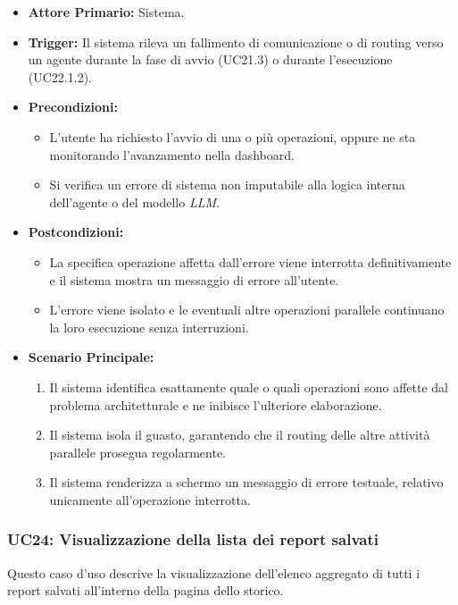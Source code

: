 \documentclass[12pt, a4paper]{article}
\begin{document}
\begin{itemize}
    \item \textbf{Attore Primario:} Sistema.
    \item \textbf{Trigger:} Il sistema rileva un fallimento di comunicazione o di routing verso un agente durante la fase di avvio (UC21.3) o durante l'esecuzione (UC22.1.2).
    \item \textbf{Precondizioni:}
    \begin{itemize}
        \item L'utente ha richiesto l'avvio di una o più operazioni, oppure ne sta monitorando l'avanzamento nella dashboard.
        \item Si verifica un errore di sistema non imputabile alla logica interna dell'agente o del modello \textit{LLM}.
    \end{itemize}
    \item \textbf{Postcondizioni:}
    \begin{itemize}
        \item La specifica operazione affetta dall'errore viene interrotta definitivamente e il sistema mostra un messaggio di errore all'utente.
        \item L'errore viene isolato e le eventuali altre operazioni parallele continuano la loro esecuzione senza interruzioni.
    \end{itemize}
    \item \textbf{Scenario Principale:}
    \begin{enumerate}
        \item Il sistema identifica esattamente quale o quali operazioni sono affette dal problema architetturale e ne inibisce l'ulteriore elaborazione.
        \item Il sistema isola il guasto, garantendo che il routing delle altre attività parallele prosegua regolarmente.
        \item Il sistema renderizza a schermo un messaggio di errore testuale, relativo unicamente all'operazione interrotta.
    \end{enumerate}
\end{itemize}

\newpage
\subsubsection{UC24: Visualizzazione della lista dei report salvati}\label{uc:24}
Questo caso d'uso descrive la visualizzazione dell'elenco aggregato di tutti i report salvati all'interno della pagina dello storico.
\end{document}
